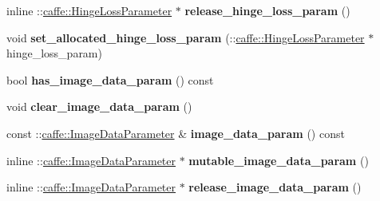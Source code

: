 \begin{DoxyCompactItemize}
\item 
\mbox{\label{classcaffe_1_1_layer_parameter_a1c180f55ae6c40b1e501973d7c65c0ea}} 
inline \+::\mbox{\hyperlink{classcaffe_1_1_hinge_loss_parameter}{caffe\+::\+Hinge\+Loss\+Parameter}} $\ast$ {\bfseries release\+\_\+hinge\+\_\+loss\+\_\+param} ()
\item 
\mbox{\label{classcaffe_1_1_layer_parameter_ae7a7010d9a346e7c48c373249fc74004}} 
void {\bfseries set\+\_\+allocated\+\_\+hinge\+\_\+loss\+\_\+param} (\+::\mbox{\hyperlink{classcaffe_1_1_hinge_loss_parameter}{caffe\+::\+Hinge\+Loss\+Parameter}} $\ast$hinge\+\_\+loss\+\_\+param)
\item 
\mbox{\label{classcaffe_1_1_layer_parameter_a8ce4aff4b2c305699bf744c7b179cd78}} 
bool {\bfseries has\+\_\+image\+\_\+data\+\_\+param} () const
\item 
\mbox{\label{classcaffe_1_1_layer_parameter_acf0c30a7a19e7fc999037423b0af1ffb}} 
void {\bfseries clear\+\_\+image\+\_\+data\+\_\+param} ()
\item 
\mbox{\label{classcaffe_1_1_layer_parameter_a154c4711afdec8b0b8f08410ee70a7ea}} 
const \+::\mbox{\hyperlink{classcaffe_1_1_image_data_parameter}{caffe\+::\+Image\+Data\+Parameter}} \& {\bfseries image\+\_\+data\+\_\+param} () const
\item 
\mbox{\label{classcaffe_1_1_layer_parameter_a5cd027244b9842efe94b5a3ba224d812}} 
inline \+::\mbox{\hyperlink{classcaffe_1_1_image_data_parameter}{caffe\+::\+Image\+Data\+Parameter}} $\ast$ {\bfseries mutable\+\_\+image\+\_\+data\+\_\+param} ()
\item 
\mbox{\label{classcaffe_1_1_layer_parameter_a702ec95f1a85fe3bae81fc2accf3b3b5}} 
inline \+::\mbox{\hyperlink{classcaffe_1_1_image_data_parameter}{caffe\+::\+Image\+Data\+Parameter}} $\ast$ {\bfseries release\+\_\+image\+\_\+data\+\_\+param} ()
\item 
\mbox{\label{classcaffe_1_1_layer_parameter_afb6ac92927feadfa7f138460e5f1d304}} 

\end{DoxyCompactItemize}
